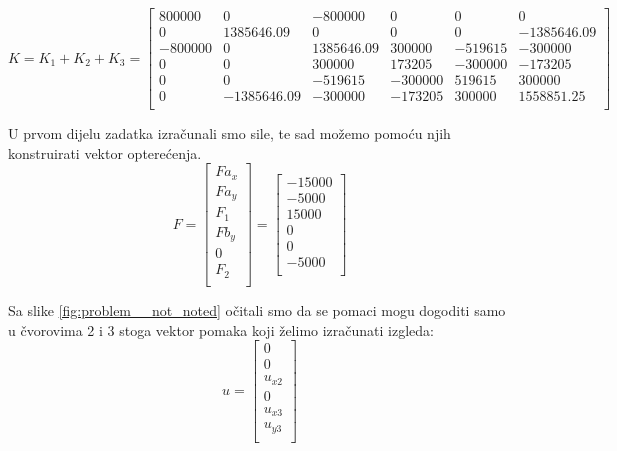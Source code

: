 \documentclass[a4paper,twoside,12pt]{memoir} %
\begin{document}
\begin{equation}
\label{eq:globalna_matrica_krutosti}
    K = K_1 + K_2 + K_3 =
    \begin{bmatrix}
    800000 & 0 & -800000 & 0 & 0 & 0 \\
    0 & 1385646.09 & 0 & 0 & 0 & -1385646.09 \\
    -800000 & 0 & 1385646.09 & 300000 & -519615 & -300000 \\
    0 & 0 & 300000 & 173205 & -300000 & -173205 \\
    0 & 0 & -519615 & -300000 & 519615 & 300000 \\
    0 & -1385646.09 & -300000 & -173205 & 300000 & 1558851.25 \\
    \end{bmatrix}
\end{equation}

U prvom dijelu zadatka izračunali smo sile, te sad možemo pomoću njih konstruirati vektor opterećenja.
\begin{equation}
\label{eq:vektor_opterecenja}
    F =
    \begin{bmatrix}
    Fa_x \\ Fa_y \\ F_1 \\ Fb_y \\ 0 \\ F_2 \\
    \end{bmatrix}
    =
    \begin{bmatrix}
    -15000 \\ -5000 \\ 15000 \\ 0 \\ 0 \\ -5000 \\
    \end{bmatrix}
\end{equation}

Sa slike \ref{fig:problem__not_noted} očitali smo da se pomaci mogu dogoditi samo u čvorovima 2 i 3 stoga vektor pomaka koji želimo izračunati izgleda:
\begin{equation}
\label{eq:vektor_pomaka}
    u =
    \begin{bmatrix}
    0 \\ 0 \\ u_{x2} \\ 0 \\ u_{x3} \\ u_{y3} \\
    \end{bmatrix}
\end{equation}
\end{document}

